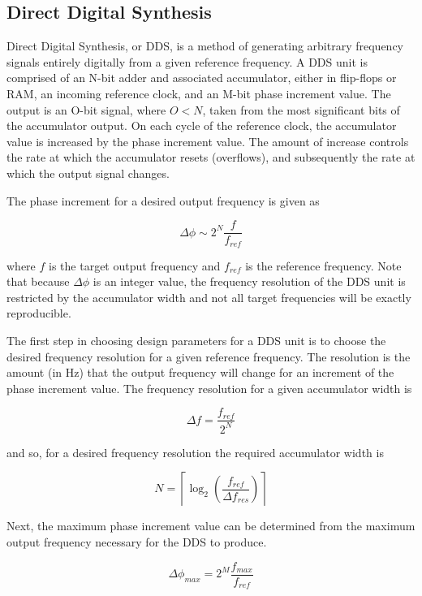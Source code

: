 \documentclass[12pt]{article}
\begin{document}
\subsection{Direct Digital Synthesis}
\label{sec:dds}
Direct Digital Synthesis, or DDS, is a method of generating arbitrary frequency signals entirely digitally from a given reference frequency. A DDS unit is comprised of an N-bit adder and associated accumulator, either in flip-flops or RAM, an incoming reference clock, and an M-bit phase increment value. The output is an O-bit signal, where $O<N$, taken from the most significant bits of the accumulator output. On each cycle of the reference clock, the accumulator value is increased by the phase increment value. The amount of increase controls the rate at which the accumulator resets (overflows), and subsequently the rate at which the output signal changes.

The phase increment for a desired output frequency is given as

\begin{equation*}
\Delta\phi \sim 2^N\frac{f}{f_{ref}}
\end{equation*}

where $f$ is the target output frequency and $f_{ref}$ is the reference frequency. Note that because $\Delta\phi$ is an integer value, the frequency resolution of the DDS unit is restricted by the accumulator width and not all target frequencies will be exactly reproducible.

The first step in choosing design parameters for a DDS unit is to choose the desired frequency resolution for a given reference frequency. The resolution is the amount (in Hz) that the output frequency will change for an increment of the phase increment value. The frequency resolution for a given accumulator width is

\begin{equation*}
\Delta f = \frac{f_{ref}}{2^N}
\end{equation*}

and so, for a desired frequency resolution the required accumulator width is

\begin{equation*}
N = \left\lceil \log_2\left( \frac{f_{ref}}{\Delta f_{res}} \right) \right\rceil
\end{equation*}

Next, the maximum phase increment value can be determined from the maximum output frequency necessary for the DDS to produce.

\begin{equation*}
\Delta\phi_{max}=2^M\frac{f_{max}}{f_{ref}}
\end{equation*}
\end{document}
